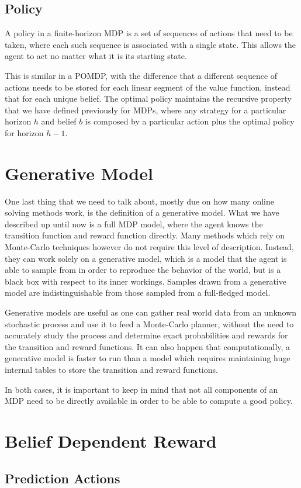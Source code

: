 \subsection{Policy}

A policy in a finite-horizon MDP is a set of sequences of actions that need to be taken, where each
such sequence is associated with a single state. This allows the agent to act no matter what it is
its starting state.

This is similar in a POMDP, with the difference that a different sequence of actions needs to be
stored for each linear segment of the value function, instead that for each unique belief. The
optimal policy maintains the recursive property that we have defined previously for MDPs, where any
strategy for a particular horizon $h$ and belief $b$ is composed by a particular action plus the
optimal policy for horizon $h-1$.

\section{Generative Model}%

One last thing that we need to talk about, mostly due on how many online solving methods work, is
the definition of a generative model. What we have described up until now is a full MDP model, where
the agent knows the transition function and reward function directly. Many methods which rely on
Monte-Carlo techniques however do not require this level of description. Instead, they can work
solely on a generative model, which is a model that the agent is able to sample from in order to
reproduce the behavior of the world, but is a black box with respect to its inner workings. Samples
drawn from a generative model are indistinguishable from those sampled from a full-fledged model.

Generative models are useful as one can gather real world data from an unknown stochastic process
and use it to feed a Monte-Carlo planner, without the need to accurately study the process and
determine exact probabilities and rewards for the transition and reward functions. It can also
happen that computationally, a generative model is faster to run than a model which requires
maintaining huge internal tables to store the transition and reward functions.

In both cases, it is important to keep in mind that not all components of an MDP need to be directly
available in order to be able to compute a good policy.

\section{Belief Dependent Reward}
\subsection{Prediction Actions}

